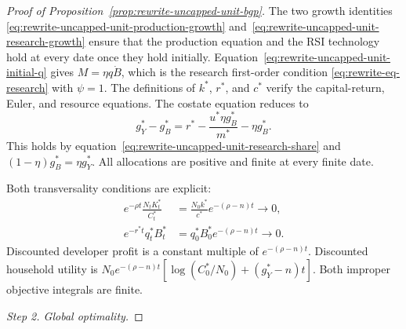 \begin{proof}[Proof of Proposition~\ref{prop:rewrite-uncapped-unit-bgp}]
The two growth identities
\eqref{eq:rewrite-uncapped-unit-production-growth}
and~\eqref{eq:rewrite-uncapped-unit-research-growth} ensure that the production
equation and the RSI technology hold at every date once they hold initially.
Equation~\eqref{eq:rewrite-uncapped-unit-initial-q} gives
$M=\eta q\dot B$, which is the research first-order condition
\eqref{eq:rewrite-eq-research} with $\psi=1$.
The definitions of $k^*$, $r^*$, and $c^*$ verify the capital-return,
Euler, and resource equations. The costate equation reduces to
\[
 g_Y^*-g_B^*
 =r^*-\frac{u^*\eta g_B^*}{m^*}-\eta g_B^*.
\]
This holds by equation~\eqref{eq:rewrite-uncapped-unit-research-share}
and $(1-\eta)g_B^*=\eta g_Y^*$.
All allocations are positive and finite at every finite date.

Both transversality conditions are explicit:
\begin{align}
 e^{-\rho t}\frac{N_tK_t^*}{C_t^*}
 &=\frac{N_0k^*}{c^*}e^{-(\rho-n)t}\longrightarrow0,
 \label{eq:rewrite-uncapped-unit-household-tvc}\\
 e^{-r^*t}q_t^*B_t^*
 &=q_0^*B_0^*e^{-(\rho-n)t}\longrightarrow0.
 \label{eq:rewrite-uncapped-unit-developer-tvc}
\end{align}
Discounted developer profit is a constant multiple of
$e^{-(\rho-n)t}$. Discounted household utility is
$N_0e^{-(\rho-n)t}[\log(C_0^*/N_0)+(g_Y^*-n)t]$.
Both improper objective integrals are finite.

\par\medskip\noindent\textit{Step 2. Global optimality.}


\end{proof}
